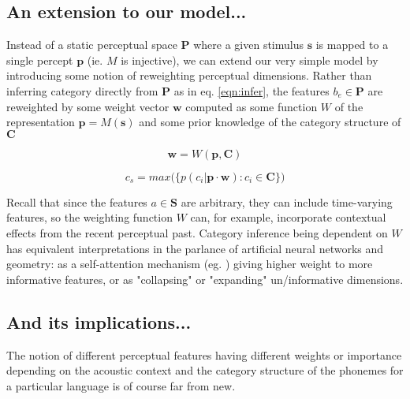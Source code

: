 \begin{multicols}{2}

\subsection{An extension to our model...}

Instead of a static perceptual space $\mathbf{P}$ where a given stimulus $\mathbf{s}$ is mapped to a single percept $\mathbf{p}$ (ie. $M$ is injective), we can extend our very simple model by introducing some notion of reweighting perceptual dimensions. Rather than inferring category directly from $\mathbf{P}$ as in eq. \ref{eqn:infer}, the features $b_e \in \mathbf{P}$ are reweighted by some weight vector $\mathbf{w}$ computed as some function $W$ of the representation $\mathbf{p} = M(\mathbf{s})$ and some prior knowledge of the category structure of $\mathbf{C}$

\begin{equation}
\label{eqn:w}
\mathbf{w} = W(\mathbf{p}, \mathbf{C})
\end{equation}

\begin{equation}
\label{eqn:infer_2}
c_s = max\big( \big\{ p(c_i | \mathbf{p} \cdot \mathbf{w}) : c_i \in \mathbf{C} \big\}\big)
\end{equation}

Recall that since the features $a \in \mathbf{S}$ are arbitrary, they can include time-varying features, so the weighting function $W$ can, for example, incorporate contextual effects from the recent perceptual past. Category inference being dependent on $W$ has equivalent interpretations in the parlance of artificial neural networks and geometry: as a self-attention mechanism (eg. \cite{vaswaniAttentionAllYou2017}) giving higher weight to more informative features, or as "collapsing" or "expanding" un/informative dimensions. 

\subsection{And its implications...}

The notion of different perceptual features having different weights or importance depending on the acoustic context and the category structure of the phonemes for a particular language is of course far from new. 


\end{multicols}

